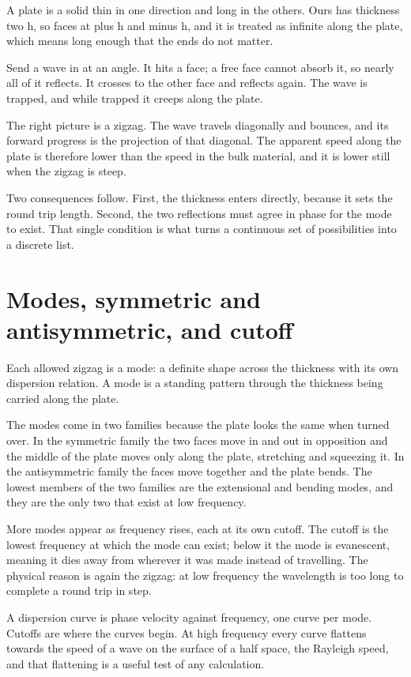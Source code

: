 \documentclass[11pt]{article}
\begin{document}
A plate is a solid thin in one direction and long in the others. Ours has thickness two h, so faces at plus h
and minus h, and it is treated as infinite along the plate, which means long enough that the ends do not
matter.

Send a wave in at an angle. It hits a face; a free face cannot absorb it, so nearly all of it reflects. It
crosses to the other face and reflects again. The wave is trapped, and while trapped it creeps along the
plate.

The right picture is a zigzag. The wave travels diagonally and bounces, and its forward progress is the
projection of that diagonal. The apparent speed along the plate is therefore lower than the speed in the bulk
material, and it is lower still when the zigzag is steep.

Two consequences follow. First, the thickness enters directly, because it sets the round trip length. Second,
the two reflections must agree in phase for the mode to exist. That single condition is what turns a
continuous set of possibilities into a discrete list.

\section{Modes, symmetric and antisymmetric, and cutoff}

Each allowed zigzag is a mode: a definite shape across the thickness with its own dispersion relation. A mode
is a standing pattern through the thickness being carried along the plate.

The modes come in two families because the plate looks the same when turned over. In the symmetric family the
two faces move in and out in opposition and the middle of the plate moves only along the plate, stretching
and squeezing it. In the antisymmetric family the faces move together and the plate bends. The lowest members
of the two families are the extensional and bending modes, and they are the only two that exist at low
frequency.

More modes appear as frequency rises, each at its own cutoff. The cutoff is the lowest frequency at which the
mode can exist; below it the mode is evanescent, meaning it dies away from wherever it was made instead of
travelling. The physical reason is again the zigzag: at low frequency the wavelength is too long to complete a
round trip in step.

A dispersion curve is phase velocity against frequency, one curve per mode. Cutoffs are where the curves
begin. At high frequency every curve flattens towards the speed of a wave on the surface of a half space, the
Rayleigh speed, and that flattening is a useful test of any calculation.
\end{document}
